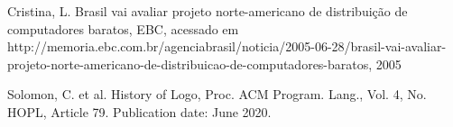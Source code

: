 \documentclass[
12pt,		%
openright,	%
twoside,  %
a4paper,			%
chapter=TITLE,		%
english,			%
french,				%
spanish,			%
brazil				%
]{USPSC-classe/USPSC}
\begin{document}
\begin{flushleft}
\begin{flushleft}
\begin{flushleft}
\begin{flushleft}
\begin{flushleft}
\begin{flushleft}
\begin{flushleft}
\begin{flushleft}
\begin{flushleft}
[CRISTINA, 2005] Cristina, L. Brasil vai avaliar projeto norte-americano de distribui\c{c}\~ao de computadores baratos, EBC, acessado em http://memoria.ebc.com.br/agenciabrasil/noticia/2005-06-28/brasil-vai-avaliar-projeto-norte-americano-de-distribuicao-de-computadores-baratos, 2005
\end{flushleft}


\end{flushleft}


\end{flushleft}


\end{flushleft}


\end{flushleft}


\end{flushleft}


\end{flushleft}


\end{flushleft}


\end{flushleft}


\begin{flushleft}
\begin{flushleft}
\begin{flushleft}
\begin{flushleft}
\begin{flushleft}
\begin{flushleft}
\begin{flushleft}
\begin{flushleft}
\begin{flushleft}
[SOLOMON et al., 2020] Solomon, C. et al. History of Logo, Proc. ACM Program. Lang., Vol. 4, No. HOPL, Article 79. Publication date: June 2020.
\end{flushleft}


\end{flushleft}


\end{flushleft}


\end{flushleft}


\end{flushleft}


\end{flushleft}


\end{flushleft}


\end{flushleft}


\end{flushleft}
\end{document}
